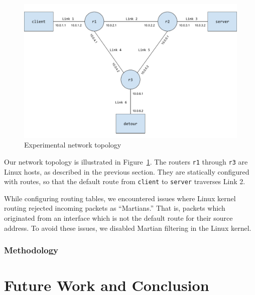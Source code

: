 \documentclass{cwru}
\begin{document}
\begin{figure}
  \centering
  \includegraphics[width=\textwidth]{figures/Topology.pdf}
  \caption{Experimental network topology}
  \label{fig:topo}
\end{figure}

Our network topology is illustrated in Figure~\ref{fig:topo}. The routers
\texttt{r1} through \texttt{r3} are Linux hosts, as described in the previous
section. They are statically configured with routes, so that the default route
from \texttt{client} to \texttt{server} traverses Link 2.

While configuring routing tables, we encountered issues where Linux kernel
routing rejected incoming packets as ``Martians.'' That is, packets which
originated from an interface which is not the default route for their source
address. To avoid these issues, we disabled Martian filtering in the Linux
kernel.



\subsection{Methodology}


\chapter{Future Work and Conclusion}
\label{c:fwconclude}

\backmatter
\appendix



\end{document}
